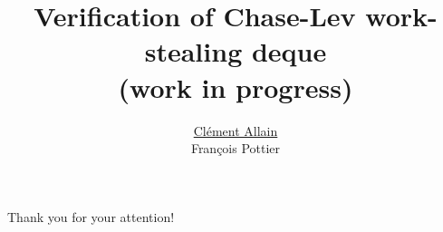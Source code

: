 \documentclass[serif]{beamer}
\title{
	Verification of Chase-Lev work-stealing deque \\
	(work in progress)
}
\author{
	\underline{Clément Allain} \\
	François Pottier
}
\institute{
	Inria Paris
}
\begin{document}

\begin{frame}
\titlepage
\end{frame}












\begin{frame}
\LARGE
\begin{center}
	Thank you for your attention!
\end{center}
\end{frame}


\appendix





\end{document}
